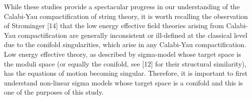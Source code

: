 \documentclass[a4paper,12pt]{article}
\begin{document}
{While these studies provide a spectacular progress in our understanding of
the Calabi-Yau compactification of string theory, it is worth recalling the
observation of Strominger [14] that the low energy effective field theories
arising from Calabi-Yau compactification are generally inconsistent or 
ill-defined at the classical level due to the conifold singularities, which
arise in any Calabi-Yau compactification. Low energy effective theory, as
described by sigma-model whose target space is the moduli space (or equally the
conifold, see [12] for their structural similarity), has the equations of motion becoming singular. Therefore, it is important to first understand non-linear
sigma models whose target space is a conifold and this is one of the purposes of 
this study. 

\vspace{0.5cm}

}
\end{document}
